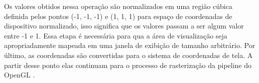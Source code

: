 Os valores obtidos nessa operação são normalizados em uma região cúbica definida pelos pontos (-1, -1, -1) e (1, 1, 1) para espaço de coordenadas de dispositivo normalizado, isso significa que os valores passam a ser algum valor entre -1 e 1. Essa etapa é necessária para qua a área de visualização seja apropriadamente mapeada em uma janela de exibição de tamanho arbitrário. Por último, as coordenadas são convertidas para o sistema de coordenadas de tela. A partir desse ponto elas continuam para o processo de rasterização da pipeline do OpenGL \cite{openglOnline}. 
	\begin{figure}[hbp]
		\centering
        \begin{subfigure}{0.45\textwidth}
        \end{subfigure}
		\hfill
        \begin{subfigure}{0.47\textwidth}
        \end{subfigure}
		{
		}
	\end{figure}

